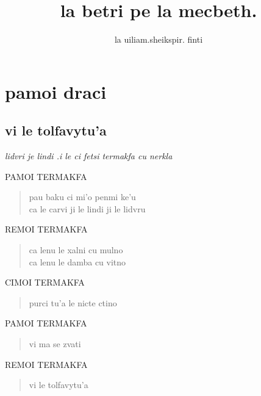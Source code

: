 \documentclass{book}
\title{la betri pe la mecbeth.}
\author{la uiliam.sheikspir. finti}
\begin{document}
\maketitle


\newcommand{\act}[1]{\part{#1}}
\newcommand{\scene}[1]{\chapter{#1}}

\newcommand{\stagedir}[1]{\textit{#1}}
\newcommand{\exeunt}{\stagedir{Exeunt.}}

\newcommand{\speak}[2]{
	\begin{center}
	\MakeUppercase{#1}
	\end{center}

	\begin{quote}#2\end{quote}
}


\act{pamoi draci}

\scene{vi le tolfavytu'a}

\stagedir{lidvri je lindi .i le ci fetsi termakfa cu nerkla}

\speak{pamoi termakfa}{
	pau baku ci mi'o penmi ke'u\\
	ca le carvi ji le lindi ji le lidvru}

\speak{remoi termakfa}{
	ca lenu le xalni cu mulno\\
	ca lenu le damba cu vitno}

\speak{cimoi termakfa}{
	purci tu'a le nicte ctino}

\speak{pamoi termakfa}{
	vi ma se zvati}

\speak{remoi termakfa}{
	vi le tolfavytu'a}
\end{document}
